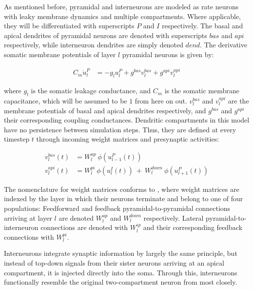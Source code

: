 As mentioned before, pyramidal and interneurons are modeled as rate neurons with leaky membrane dynamics and multiple
compartments. Where applicable, they will be differentiated with superscripts $P$ and $I$ respectively. The basal and
apical dendrites of pyramidal neurons are denoted with superscripts $bas$ and $api$ respectively, while interneuron
dendrites are simply denoted $dend$.  The derivative somatic membrane potentials of layer $l$ pyramidal neurons is given by:

\begin{align}
  C_m \dot{u}_l^P & = - g_l u_l^{P} + g^{bas} v_l^{bas} + g^{api} v_l^{api} \label{eq-pyr-dynamics-rate}
\end{align}

where $g_l$ is the somatic leakage conductance, and $C_m$ is the somatic membrane capacitance, which will be assumed to
be $1$ from here on out. $v_l^{bas}$ and $v_l^{api}$ are the membrane potentials of basal and apical dendrites
respectively, and $g^{bas}$ and $g^{api}$ their corresponding coupling conductances.  Dendritic compartments in this
model have no persistence between simulation steps. Thus, they are defined at every timestep $t$ through incoming weight
matrices and presynaptic activities:

\begin{align}
  v_l^{bas}(t) & = W_l^{up} \ \phi(u_{l-1}^P(t)) \label{eq-v-bas-rate}                                     \\
  v_l^{api}(t) & =  W_l^{pi} \ \phi(u_l^I(t)) \ + \  W_l^{down} \ \phi(u_{l+1}^P(t)) \label{eq-v-api-rate}
\end{align}

The nomenclature for weight matrices conforms to \cite{Haider2021}, where weight matrices are indexed by the layer in
which their neurons terminate and belong to one of four populations: Feedforward and feedback pyramidal-to-pyramidal
connections arriving at layer $l$ are denoted $W_l^{up}$ and $W_l^{down}$ respectively. Lateral pyramidal-to-interneuron
connections are denoted with $W_l^{ip}$ and their corresponding feedback connections with $W_l^{pi}$.
\newline

Interneurons integrate synaptic information by largely the same principle, but instead of top-down signals from their
sister neurons arriving at an apical compartment, it is injected directly into the soma. Through this, interneurons
functionally resemble the original two-compartment neuron from \cite{urbanczik2014learning} most closely.

